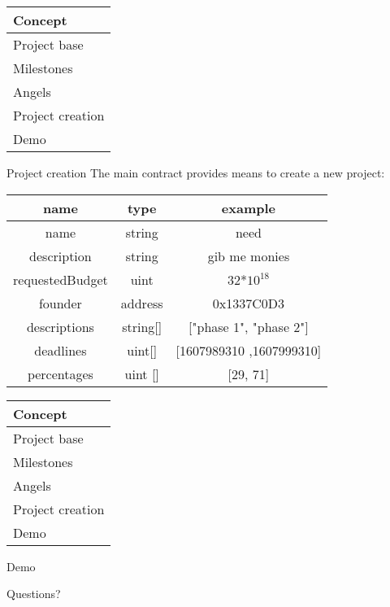\documentclass{beamer}
\begin{document}
\begin{frame}
	\begin{tabularx}{\textwidth}{X}
		\hline
		Concept\\
		\hline
		Project base\\
		\hline
		Milestones\\
		\hline
		Angels\\
		\hline
		\rowcolor{hcolor}
		Project creation\\
		\hline
		Demo\\
		\hline
	\end{tabularx}
\end{frame}


\begin{frame}{Project creation}
The main contract provides means to create a new project:\\
\vspace{7mm}
\begin{center}
	\begin{tabular}{c|c||c}
		name & type & example \\
		\hline
		 name & string & need \\
		 description & string & gib me monies \\
		 requestedBudget & uint & 32*$10^{18}$ \\
		 founder & address & 0x1337C0D3 \\
		 descriptions & string[] & ["phase 1", "phase 2"] \\
		 deadlines & uint[] & [1607989310 ,1607999310] \\
		 percentages & uint [] & [29, 71] \\
	\end{tabular}
\end{center}
\end{frame}


\begin{frame}
	\begin{tabularx}{\textwidth}{X}
		\hline
		Concept\\
		\hline
		Project base\\
		\hline
		Milestones\\
		\hline
		Angels\\
		\hline
		Project creation\\
		\hline
		\rowcolor{hcolor}
		Demo\\
		\hline
	\end{tabularx}
\end{frame}



\begin{frame}
	\begin{center}
		\huge{Demo}
	\end{center}
\end{frame}



\begin{frame}
	\begin{center}
		\huge{Questions?}
	\end{center}
\end{frame}
\end{document}
